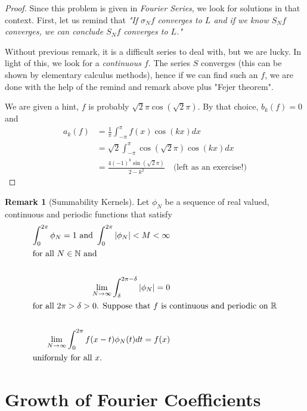 \documentclass[12pt]{amsart}
\theoremstyle{definition}
\newtheorem{remark}[theorem]{Remark}
\begin{document}
\begin{proof}
    Since this problem is given in \textit{Fourier Series}, we look for solutions in that context. First, let us remind that \textit{"If $\sigma_Nf$ converges to $L$ and if we know $S_Nf$ converges, we can conclude $S_Nf$ converges to $L$."}

    \par Without previous remark, it is a difficult series to deal with, but we are lucky. In light of this, we look for a \textit{continuous $f$}. The series $S$ converges (this can be shown by elementary calculus methods), hence if we can find such an \(f\), we are done with the help of the remind and remark above plus "Fejer theorem". \par

    We are given a hint, \(f\) is probably $\sqrt{2}\pi\cos(\sqrt{2}\pi)$. By that choice, $b_k(f) = 0$ and
    \begin{align*}
        a_k(f) &= \frac{1}{\pi} \int_{-\pi}^{\pi} f(x) \cos(kx) dx \\
               &= \sqrt{2} \int_{-\pi}^{\pi}  \cos(\sqrt{2}\pi) \cos(kx) dx \\
               &= \frac{4(-1)^k\sin(\sqrt{2}\pi)}{2-k^2} \quad \text{(left as an exercise!)}
    \end{align*}
\end{proof}


\begin{remark}[Summability Kernels] Let $\phi_N$ be a sequence of real valued, continuous and periodic functions that satisfy
\begin{align*}
    \int_{0}^{2\pi} \phi_N = 1 \text{ and } \int_{0}^{2\pi} |\phi_N| < M < \infty \\
    \intertext{for all $N \in \mathbb{N}$ and }\\
    \lim_{N \to \infty} \int_{\delta}^{2\pi - \delta} |\phi_N| = 0\\
    \intertext{for all $2\pi > \delta > 0$. Suppose that $f$ is continuous and periodic on $\mathbb{R}$}\\
    \lim_{N \to \infty} \int_{0}^{2\pi} f(x - t)\phi_N(t)dt = f(x)\\
    \intertext{uniformly for all $x$.}
\end{align*}
\end{remark}


\section{Growth of Fourier Coefficients}
\end{document}

